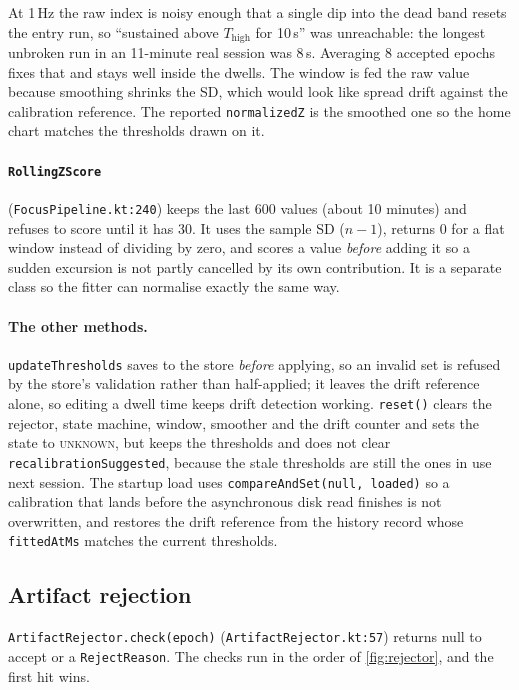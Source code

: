 \documentclass[10pt,a4paper]{article}
\newcommand{\file}[1]{\texttt{\small #1}}          %
\newcommand{\code}[1]{\texttt{#1}}                  %
\newcommand{\state}[1]{\textsc{\small #1}}          %
\newcommand{\Thigh}{T_{\mathrm{high}}}
\begin{document}
\begin{why}
At 1\,Hz the raw index is noisy enough that a single dip into the dead band resets the entry run,
so ``sustained above $\Thigh$ for 10\,s'' was unreachable: the longest unbroken run in an
11-minute real session was 8\,s. Averaging 8 accepted epochs fixes that and stays well inside the
dwells. The window is fed the raw value because smoothing shrinks the SD, which would look like
spread drift against the calibration reference. The reported \code{normalizedZ} is the smoothed
one so the home chart matches the thresholds drawn on it.
\end{why}

\paragraph{\code{RollingZScore}} (\file{FocusPipeline.kt:240}) keeps the last 600 values (about
10 minutes) and refuses to score until it has 30. It uses the sample SD ($n-1$), returns 0 for a
flat window instead of dividing by zero, and scores a value \emph{before} adding it so a sudden
excursion is not partly cancelled by its own contribution. It is a separate class so the fitter
can normalise exactly the same way.

\paragraph{The other methods.} \code{updateThresholds} saves to the store \emph{before} applying,
so an invalid set is refused by the store's validation rather than half-applied; it leaves the
drift reference alone, so editing a dwell time keeps drift detection working. \code{reset()}
clears the rejector, state machine, window, smoother and the drift counter and sets the state to
\state{unknown}, but keeps the thresholds and does not clear \code{recalibrationSuggested},
because the stale thresholds are still the ones in use next session. The startup load uses
\code{compareAndSet(null, loaded)} so a calibration that lands before the asynchronous disk read
finishes is not overwritten, and restores the drift reference from the history record whose
\code{fittedAtMs} matches the current thresholds.

\subsection{Artifact rejection}

\code{ArtifactRejector.check(epoch)} (\file{ArtifactRejector.kt:57}) returns null to accept or a
\code{RejectReason}. The checks run in the order of \cref{fig:rejector}, and the first hit wins.
\end{document}
